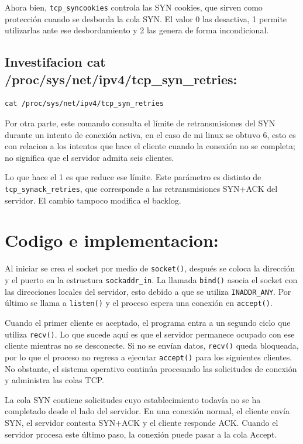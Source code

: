 \documentclass[letterpaper,11pt]{article}
\begin{document}
Ahora bien, \texttt{tcp\_syncookies} controla las SYN cookies, 
que sirven como protección cuando se desborda la cola SYN. 
El valor 0 las desactiva, 1 permite utilizarlas ante ese desbordamiento 
y 2 las genera de forma incondicional.

\subsection{Investifacion  cat /proc/sys/net/ipv4/tcp\_syn\_retries:}

\begin{lstlisting}[style=output]
cat /proc/sys/net/ipv4/tcp_syn_retries
\end{lstlisting}

Por otra parte, este comando consulta el límite de retransmisiones 
del SYN durante un intento de conexión activa, en el caso de mi linux
se obtuvo 6, esto es con relacion a los intentos que hace el 
cliente cuando la conexión no se completa; no significa que el 
servidor admita seis clientes.

Lo que hace el 1 es que reduce ese límite. 
Este parámetro es distinto de \texttt{tcp\_synack\_retries}, 
que corresponde a las retransmisiones SYN+ACK del servidor. 
El cambio tampoco modifica el backlog.

\section{Codigo e implementacion:}


Al iniciar se crea el socket por medio de \texttt{socket()}, después se coloca la dirección y el puerto en la estructura \texttt{sockaddr\_in}. La llamada \texttt{bind()} asocia el socket con las direcciones locales del servidor, esto debido a que se utiliza \texttt{INADDR\_ANY}. Por último se llama a \texttt{listen()} y el proceso espera una conexión en \texttt{accept()}.

Cuando el primer cliente es aceptado, el programa entra a un segundo ciclo que utiliza \texttt{recv()}. Lo que sucede aquí es que el servidor permanece ocupado con ese cliente mientras no se desconecte. Si no se envían datos, \texttt{recv()} queda bloqueada, por lo que el proceso no regresa a ejecutar \texttt{accept()} para los siguientes clientes. No obstante, el sistema operativo continúa procesando las solicitudes de conexión y administra las colas TCP.

La cola SYN contiene solicitudes cuyo establecimiento todavía no se ha completado desde el lado del servidor. En una conexión normal, el cliente envía SYN, el servidor contesta SYN+ACK y el cliente responde ACK. Cuando el servidor procesa este último paso, la conexión puede pasar a la cola Accept.
\end{document}
